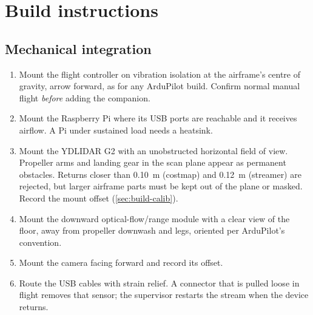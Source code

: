 \section{Build instructions}
\label{sec:build}

\noindent{}

\subsection{Mechanical integration}
\label{sec:build-mech}

\begin{enumerate}[leftmargin=*,itemsep=2pt]
  \item Mount the flight controller on vibration isolation at the airframe's centre
    of gravity, arrow forward, as for any ArduPilot build. Confirm normal manual
    flight \emph{before} adding the companion.
  \item Mount the Raspberry Pi where its USB ports are reachable and it receives
    airflow. A Pi under sustained load needs a heatsink.
  \item Mount the YDLIDAR G2 with an unobstructed horizontal field of view. Propeller
    arms and landing gear in the scan plane appear as permanent obstacles. Returns
    closer than \SI{0.10}{\metre} (costmap) and \SI{0.12}{\metre} (streamer) are
    rejected, but larger airframe parts must be kept out of the plane or masked.
    Record the mount offset (\cref{sec:build-calib}).
  \item Mount the downward optical-flow/range module with a clear view of the floor,
    away from propeller downwash and legs, oriented per ArduPilot's
     convention.
  \item Mount the camera facing forward and record its offset.
  \item Route the USB cables with strain relief. A connector that is pulled loose in
    flight removes that sensor; the supervisor restarts the stream when the device
    returns.
\end{enumerate}

